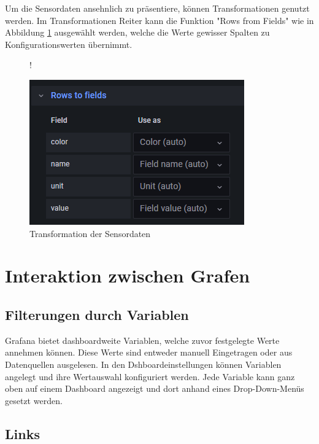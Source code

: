 \documentclass[a4paper, 12pt, oneside]{scrbook}
\begin{document}
	 	\noindent Um die Sensordaten ansehnlich zu präsentiere, können Transformationen genutzt werden. Im Transformationen Reiter kann die Funktion "Rows from Fields" wie in Abbildung \ref{fig:transformation} ausgewählt werden, welche die Werte gewisser Spalten zu Konfigurationswerten übernimmt. 
	 	
	 	\begin{figure} [H]
	 		\centering
	 		\resizebox{75mm} {!} {
	 			\includegraphics{res/transformation.png}
	 			
	 		}
	 		\caption{Transformation der Sensordaten}
	 		\label{fig:transformation}
	 	\end{figure}
 		
	 \section{Interaktion zwischen Grafen}
	 	
	 	\subsection{Filterungen durch Variablen}
	 	
	 	\noindent Grafana bietet dashboardweite Variablen, welche zuvor festgelegte Werte annehmen können. Diese Werte sind entweder manuell Eingetragen oder aus Datenquellen ausgelesen. In den Dshboardeinstellungen können Variablen angelegt und ihre Wertauswahl konfiguriert werden. Jede Variable kann ganz oben auf einem Dashboard angezeigt und dort anhand eines Drop-Down-Menüs gesetzt werden. 
	 	
	 	\noindent 
	  	
		\subsection{Links}
		 
\end{document}
